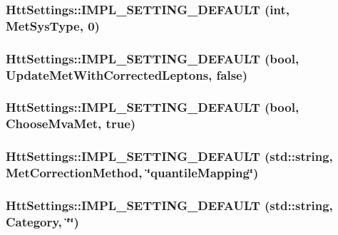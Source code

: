 \hypertarget{classHttSettings_a128ab2e519a985d51e811cf99e197646}{
\subsubsection[{IMPL\_\-SETTING\_\-DEFAULT}]{\setlength{\rightskip}{0pt plus 5cm}HttSettings::IMPL\_\-SETTING\_\-DEFAULT (int, \/  MetSysType, \/  0)}}
\label{classHttSettings_a128ab2e519a985d51e811cf99e197646}
\hypertarget{classHttSettings_a3dc8d9cd8094adc68ce060e2a0202360}{
\subsubsection[{IMPL\_\-SETTING\_\-DEFAULT}]{\setlength{\rightskip}{0pt plus 5cm}HttSettings::IMPL\_\-SETTING\_\-DEFAULT (bool, \/  UpdateMetWithCorrectedLeptons, \/  false)}}
\label{classHttSettings_a3dc8d9cd8094adc68ce060e2a0202360}
\hypertarget{classHttSettings_a69b5087e83cd55eb36de66134b3622d5}{
\subsubsection[{IMPL\_\-SETTING\_\-DEFAULT}]{\setlength{\rightskip}{0pt plus 5cm}HttSettings::IMPL\_\-SETTING\_\-DEFAULT (bool, \/  ChooseMvaMet, \/  true)}}
\label{classHttSettings_a69b5087e83cd55eb36de66134b3622d5}
\hypertarget{classHttSettings_a712769a2f44e79f09a2810f9bb3556f2}{
\subsubsection[{IMPL\_\-SETTING\_\-DEFAULT}]{\setlength{\rightskip}{0pt plus 5cm}HttSettings::IMPL\_\-SETTING\_\-DEFAULT (std::string, \/  MetCorrectionMethod, \/  \char`\"{}quantileMapping\char`\"{})}}
\label{classHttSettings_a712769a2f44e79f09a2810f9bb3556f2}
\hypertarget{classHttSettings_abe7e0c6ca1d63a2ad87bd40567eccd61}{
\subsubsection[{IMPL\_\-SETTING\_\-DEFAULT}]{\setlength{\rightskip}{0pt plus 5cm}HttSettings::IMPL\_\-SETTING\_\-DEFAULT (std::string, \/  Category, \/  \char`\"{}\char`\"{})}}
